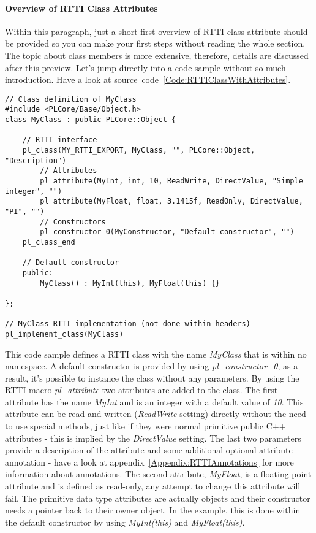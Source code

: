 \paragraph{Overview of RTTI Class Attributes}
Within this paragraph, just a short first overview of RTTI class attribute should be provided so you can make your first steps without reading the whole section. The topic about class members is more extensive, therefore, details are discussed after this preview. Let's jump directly into a code sample without so much introduction. Have a look at source~code~\ref{Code:RTTIClassWithAttributes}.
\begin{lstlisting}[float=htb,label=Code:RTTIClassWithAttributes,caption={Defining a new RTTI class with attributes}]
// Class definition of MyClass
#include <PLCore/Base/Object.h>
class MyClass : public PLCore::Object {

	// RTTI interface
	pl_class(MY_RTTI_EXPORT, MyClass, "", PLCore::Object, "Description")
		// Attributes
		pl_attribute(MyInt, int, 10, ReadWrite, DirectValue, "Simple integer", "")
		pl_attribute(MyFloat, float, 3.1415f, ReadOnly, DirectValue, "PI", "")
		// Constructors
		pl_constructor_0(MyConstructor, "Default constructor", "")
	pl_class_end

	// Default constructor
	public:
		MyClass() : MyInt(this), MyFloat(this) {}

};

// MyClass RTTI implementation (not done within headers)
pl_implement_class(MyClass)
\end{lstlisting}
This code sample defines a RTTI class with the name \emph{MyClass} that is within no namespace. A default constructor is provided by using \emph{pl\_constructor\_0}, as a result, it's possible to instance the class without any parameters. By using the RTTI macro \emph{pl\_attribute} two attributes are added to the class. The first attribute has the name \emph{MyInt} and is an integer with a default value of \emph{10}. This attribute can be read and written (\emph{ReadWrite} setting) directly without the need to use special methods, just like if they were normal primitive public C++ attributes - this is implied by the \emph{DirectValue} setting. The last two parameters provide a description of the attribute and some additional optional attribute annotation - have a look at appendix~\ref{Appendix:RTTIAnnotations} for more information about annotations. The second attribute, \emph{MyFloat}, is a floating point attribute and is defined as read-only, any attempt to change this attribute will fail. The primitive data type attributes are actually objects and their constructor needs a pointer back to their owner object. In the example, this is done within the default constructor by using \emph{MyInt(this)} and \emph{MyFloat(this)}.

